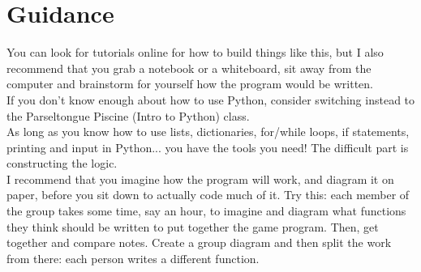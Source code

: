 \documentclass{42-en}
\begin{document}

\chapter{Guidance}

You can look for tutorials online for how to build things like this, but I also recommend that you grab a notebook or a whiteboard, sit away from the computer and brainstorm for yourself how the program would be written.\\

If you don't know enough about how to use Python, consider switching instead to the Parseltongue Piscine (Intro to Python) class.\\

As long as you know how to use lists, dictionaries, for/while loops, if statements, printing and input in Python... you have the tools you need! The difficult part is constructing the logic.\\

I recommend that you imagine how the program will work, and diagram it on paper, before you sit down to actually code much of it. Try this: each member of the group takes some time, say an hour, to imagine and diagram what functions they think should be written to put together the game program. Then, get together and compare notes. Create a group diagram and then split the work from there: each person writes a different function.
\end{document}
